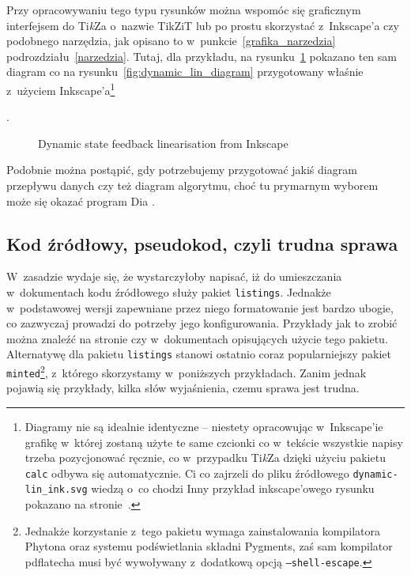 {\red Przy opracowywaniu tego typu rysunków można wspomóc się graficznym interfejsem do Ti{\it k}Za o~nazwie TikZiT \cite{tikzit} lub po prostu skorzystać z~Inkscape'a czy podobnego narzędzia, jak opisano to w~punkcie~\ref{grafika_narzedzia} podrozdziału~\ref{narzedzia}. Tutaj, dla przykładu, na rysunku~\ref{fig:dynamic_lin_diagram_ink} pokazano ten sam diagram co na rysunku~\ref{fig:dynamic_lin_diagram} przygotowany właśnie z~użyciem Inkscape'a\footnote{\red Diagramy nie są idealnie identyczne -- niestety opracowując w~Inkscape'ie grafikę w~której zostaną użyte te same czcionki co w~tekście wszystkie napisy trzeba pozycjonować ręcznie, co w~przypadku Ti{\it k}Za dzięki użyciu pakietu \texttt{calc} odbywa się automatycznie\footnotemark. Ci co zajrzeli do pliku źródłowego \texttt{dynamic-lin\_ink.svg}\footnotemark{} wiedzą o~co chodzi \smiley{}  Inny przykład inkscape'owego rysunku pokazano na stronie~\pageref{fig:transf_se3}.}\addtocounter{footnote}{-1}\addtocounter{footnote}{1}.
\begin{figure} [tp]
  \centering%
  \renewcommand{\figurename}{\red Rysunek}%
  \caption[Dynamic state feedback linearisation from Inkscape \cite{jedrzej}]{\red Dynamic state feedback linearisation from Inkscape \cite{jedrzej}}
    \label{fig:dynamic_lin_diagram_ink}
\end{figure}
Podobnie można postąpić, gdy potrzebujemy przygotować jakiś diagram przepływu danych czy też diagram algorytmu, choć tu prymarnym wyborem może się okazać program Dia \cite{dia,dia_wiki}.

  
\subsection{Kod źródłowy, pseudokod, czyli trudna sprawa}

W~zasadzie wydaje się, że wystarczyłoby napisać, iż do umieszczania w~dokumentach kodu źródłowego służy pakiet \texttt{listings}. Jednakże w~podstawowej wersji zapewniane przez niego formatowanie jest bardzo ubogie, co zazwyczaj prowadzi do potrzeby jego konfigurowania. Przykłady jak to zrobić można znaleźć na stronie \cite{list_wiki} czy w~dokumentach opisujących użycie tego pakietu. Alternatywę dla pakietu \texttt{listings} stanowi ostatnio coraz popularniejszy pakiet \texttt{minted}\footnote{\red Jednakże korzystanie z~tego pakietu wymaga zainstalowania kompilatora Phytona oraz systemu podświetlania składni Pygments, zaś sam kompilator pdflatecha musi być wywoływany z~dodatkową opcją \texttt{--shell-escape}.}, z~którego skorzystamy w~poniższych przykładach. Zanim jednak pojawią się przykłady, kilka słów wyjaśnienia, czemu sprawa jest trudna.

}
